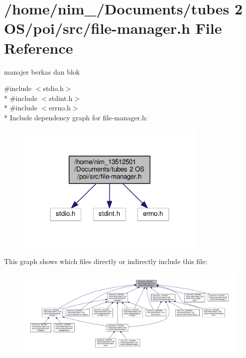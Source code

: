 \hypertarget{file-manager_8h}{\section{/home/nim\-\_/\-Documents/tubes 2 O\-S/poi/src/file-\/manager.h File Reference}
\label{file-manager_8h}
}


manajer berkas dan blok  


{\ttfamily \#include $<$stdio.\-h$>$}\\*
{\ttfamily \#include $<$stdint.\-h$>$}\\*
{\ttfamily \#include $<$errno.\-h$>$}\\*
Include dependency graph for file-\/manager.h\-:\nopagebreak
\begin{figure}[H]
\begin{center}
\leavevmode
\includegraphics[width=258pt]{file-manager_8h__incl}
\end{center}
\end{figure}
This graph shows which files directly or indirectly include this file\-:
\nopagebreak
\begin{figure}[H]
\begin{center}
\leavevmode
\includegraphics[width=350pt]{file-manager_8h__dep__incl}
\end{center}
\end{figure}
